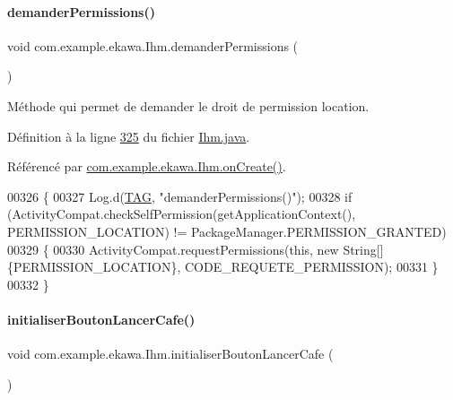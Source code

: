 \paragraph{\texorpdfstring{demander\+Permissions()}{demanderPermissions()}}
{\footnotesize\ttfamily void com.\+example.\+ekawa.\+Ihm.\+demander\+Permissions (\begin{DoxyParamCaption}{ }\end{DoxyParamCaption})\hspace{0.3cm}{\ttfamily [private]}}



Méthode qui permet de demander le droit de permission location. 



Définition à la ligne \hyperlink{_ihm_8java_source_l00325}{325} du fichier \hyperlink{_ihm_8java_source}{Ihm.\+java}.



Référencé par \hyperlink{_ihm_8java_source_l00248}{com.\+example.\+ekawa.\+Ihm.\+on\+Create()}.


\begin{DoxyCode}
00326     \{
00327         Log.d(\hyperlink{classcom_1_1example_1_1ekawa_1_1_ihm_a95cd92c2acaf9f8982302da08d94f9aa}{TAG}, \textcolor{stringliteral}{"demanderPermissions()"});
00328         \textcolor{keywordflow}{if} (ActivityCompat.checkSelfPermission(getApplicationContext(), PERMISSION\_LOCATION) != 
      PackageManager.PERMISSION\_GRANTED)
00329         \{
00330             ActivityCompat.requestPermissions(\textcolor{keyword}{this}, \textcolor{keyword}{new} String[]\{PERMISSION\_LOCATION\}, 
      CODE\_REQUETE\_PERMISSION);
00331         \}
00332     \}
\end{DoxyCode}
\mbox{\label{classcom_1_1example_1_1ekawa_1_1_ihm_a6616a5f240867f43c8e56f2b432e43be}} 
\paragraph{\texorpdfstring{initialiser\+Bouton\+Lancer\+Cafe()}{initialiserBoutonLancerCafe()}}
{\footnotesize\ttfamily void com.\+example.\+ekawa.\+Ihm.\+initialiser\+Bouton\+Lancer\+Cafe (\begin{DoxyParamCaption}{ }\end{DoxyParamCaption})\hspace{0.3cm}{\ttfamily [private]}}



